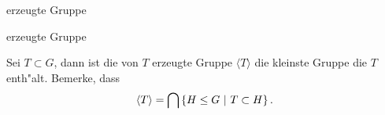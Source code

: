 \documentclass[class=article, crop=false]{standalone}
\begin{document}
\begin{zettel}{erzeugte Gruppe}
\begin{flashcard}[9bbvxa69]{erzeugte Gruppe}
	\begin{definition}
		Sei $T \subset G$, dann ist die von $T$ erzeugte Gruppe $ \langle T\rangle $ die kleinste Gruppe die $T$ enth"alt.
		Bemerke, dass
		\[
			\langle T\rangle  = \bigcap \set{H \leq G}{T \subset H}
		.\]
	\end{definition}

\end{flashcard}
\end{zettel}
\end{document}
